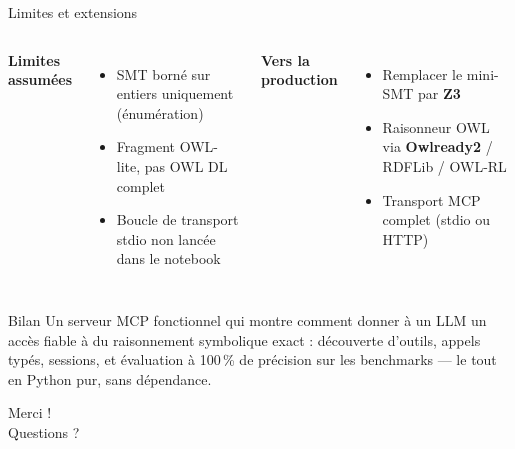 \documentclass[10pt,aspectratio=169]{beamer}
\begin{document}
\begin{frame}{Limites et extensions}
  \begin{columns}[T]
    \textbf{Limites assumées}
    \begin{itemize}
      \item SMT borné sur entiers uniquement (énumération)
      \item Fragment OWL-lite, pas OWL DL complet
      \item Boucle de transport stdio non lancée dans le notebook
    \end{itemize}
    \textbf{Vers la production}
    \begin{itemize}
      \item Remplacer le mini-SMT par \textbf{Z3}
      \item Raisonneur OWL via \textbf{Owlready2} / RDFLib / OWL-RL
      \item Transport MCP complet (stdio ou HTTP)
    \end{itemize}
  \end{columns}
  \vfill
  \begin{block}{Bilan}
    Un serveur MCP fonctionnel qui montre comment donner à un LLM un accès
    fiable à du raisonnement symbolique exact : découverte d'outils,
    appels typés, sessions, et évaluation à 100\,\% de précision sur les
    benchmarks --- le tout en Python pur, sans dépendance.
  \end{block}
\end{frame}

\begin{frame}
  \begin{center}
    {\Huge Merci !}\\[0.8cm]
    {\large Questions ?}
  \end{center}
\end{frame}
\end{document}
